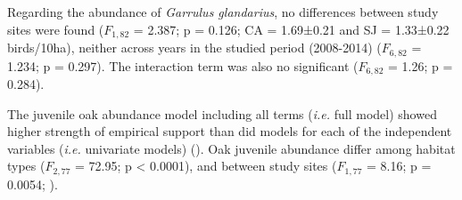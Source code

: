 \begin{table}
\caption{Forest attributes of northern (SJ) and southern (CA) sites. U Mann-Withney statistics with significance at 0.05 level. Mean and SE are shown}
\centering
{}
\label{tab:coloniza:forest}
\end{table}

Regarding the abundance of \emph{Garrulus glandarius}, no differences between study sites were found (\(F_{1,82}\) = 2.387; p = 0.126; CA = 1.69±0.21 and SJ = 1.33±0.22 birds/10ha), neither across years in the studied period (2008-2014) (\(F_{6,82}\) = 1.234; p = 0.297). The interaction term was also no significant (\(F_{6,82}\) = 1.26; p = 0.284).

The juvenile oak abundance model including all terms (\emph{i.e.} full model) showed higher strength of empirical support than did models for each of the independent variables (\emph{i.e.} univariate models) (). Oak juvenile abundance differ among habitat types (\(F_{2,77}\) = 72.95; p < 0.0001), and between study sites (\(F_{1,77}\) = 8.16; p = 0.0054; ). 

